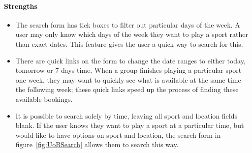 \paragraph{Strengths}
\begin{itemize}
	\item The search form has tick boxes to filter out particular days of the
		week. A user may only know which days of the week they want to play a
		sport rather than exact dates. This feature gives the user a quick way
		to search for this.
	\item There are quick links on the form to change the date ranges to either
		today, tomorrow or 7 days time. When a group finishes playing a
		particular sport one week, they may want to quickly see what is
		available at the same time the following week; these quick links speed
		up the process of finding these available bookings.
	\item It is possible to search solely by time, leaving all sport and
		location fields blank. If the user knows they want to play a sport at a
		particular time, but would like to have options on sport and location,
		the search form in figure~\ref{fig:UoBSearch} allows them to search
		this way.
\end{itemize}

